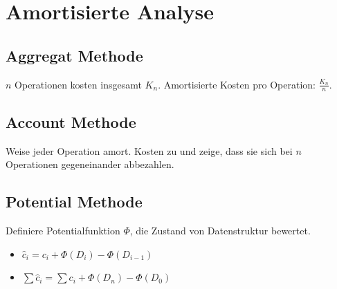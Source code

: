 \section*{Amortisierte Analyse}

\subsection*{Aggregat Methode}
$n$ Operationen kosten insgesamt $K_n$.
Amortisierte Kosten pro Operation: $\frac{K_n}{n}$.

\subsection*{Account Methode}
Weise jeder Operation amort. Kosten zu
und zeige, dass sie sich bei $n$ Operationen gegeneinander abbezahlen.

\subsection*{Potential Methode}
Definiere Potentialfunktion $\Phi$, die Zustand von Datenstruktur bewertet.
\begin{itemize}
	\item $\hat{c}_i = c_i + \Phi(D_i) - \Phi(D_{i-1})$
	\item $\sum \hat{c}_i = \sum c_i + \Phi(D_n) - \Phi(D_0)$
\end{itemize}
